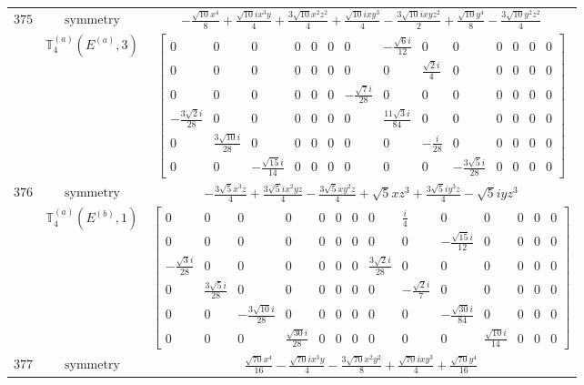 \documentclass[fleqn,8pt,landscape]{jsarticle}
\begin{document}
\begin{longtable}{ccc}
$ 375 $ & $ \text{symmetry} $ & $ - \frac{\sqrt{10} x^{4}}{8} + \frac{\sqrt{10} i x^{3} y}{4} + \frac{3 \sqrt{10} x^{2} z^{2}}{4} + \frac{\sqrt{10} i x y^{3}}{4} - \frac{3 \sqrt{10} i x y z^{2}}{2} + \frac{\sqrt{10} y^{4}}{8} - \frac{3 \sqrt{10} y^{2} z^{2}}{4} $ \\
$  $ & $ \mathbb{T}_{4}^{(a)}(E^{(a)},3) $ & $ \begin{bmatrix} 0 & 0 & 0 & 0 & 0 & 0 & 0 & - \frac{\sqrt{6} i}{12} & 0 & 0 & 0 & 0 & 0 & 0 \\ 0 & 0 & 0 & 0 & 0 & 0 & 0 & 0 & \frac{\sqrt{2} i}{4} & 0 & 0 & 0 & 0 & 0 \\ 0 & 0 & 0 & 0 & 0 & 0 & - \frac{\sqrt{7} i}{28} & 0 & 0 & 0 & 0 & 0 & 0 & 0 \\ - \frac{3 \sqrt{2} i}{28} & 0 & 0 & 0 & 0 & 0 & 0 & \frac{11 \sqrt{3} i}{84} & 0 & 0 & 0 & 0 & 0 & 0 \\ 0 & \frac{3 \sqrt{10} i}{28} & 0 & 0 & 0 & 0 & 0 & 0 & - \frac{i}{28} & 0 & 0 & 0 & 0 & 0 \\ 0 & 0 & - \frac{\sqrt{15} i}{14} & 0 & 0 & 0 & 0 & 0 & 0 & - \frac{3 \sqrt{5} i}{28} & 0 & 0 & 0 & 0 \end{bmatrix} $ \\ \hline
$ 376 $ & $ \text{symmetry} $ & $ - \frac{3 \sqrt{5} x^{3} z}{4} + \frac{3 \sqrt{5} i x^{2} y z}{4} - \frac{3 \sqrt{5} x y^{2} z}{4} + \sqrt{5} x z^{3} + \frac{3 \sqrt{5} i y^{3} z}{4} - \sqrt{5} i y z^{3} $ \\
$  $ & $ \mathbb{T}_{4}^{(a)}(E^{(b)},1) $ & $ \begin{bmatrix} 0 & 0 & 0 & 0 & 0 & 0 & 0 & 0 & \frac{i}{4} & 0 & 0 & 0 & 0 & 0 \\ 0 & 0 & 0 & 0 & 0 & 0 & 0 & 0 & 0 & - \frac{\sqrt{15} i}{12} & 0 & 0 & 0 & 0 \\ - \frac{\sqrt{3} i}{28} & 0 & 0 & 0 & 0 & 0 & 0 & \frac{3 \sqrt{2} i}{28} & 0 & 0 & 0 & 0 & 0 & 0 \\ 0 & \frac{3 \sqrt{5} i}{28} & 0 & 0 & 0 & 0 & 0 & 0 & - \frac{\sqrt{2} i}{7} & 0 & 0 & 0 & 0 & 0 \\ 0 & 0 & - \frac{3 \sqrt{10} i}{28} & 0 & 0 & 0 & 0 & 0 & 0 & - \frac{\sqrt{30} i}{84} & 0 & 0 & 0 & 0 \\ 0 & 0 & 0 & \frac{\sqrt{30} i}{28} & 0 & 0 & 0 & 0 & 0 & 0 & \frac{\sqrt{10} i}{14} & 0 & 0 & 0 \end{bmatrix} $ \\ \hline
$ 377 $ & $ \text{symmetry} $ & $ \frac{\sqrt{70} x^{4}}{16} - \frac{\sqrt{70} i x^{3} y}{4} - \frac{3 \sqrt{70} x^{2} y^{2}}{8} + \frac{\sqrt{70} i x y^{3}}{4} + \frac{\sqrt{70} y^{4}}{16} $ \\

\end{longtable}
\end{document}
